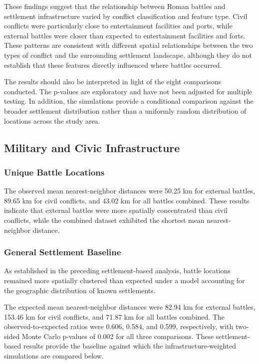 \documentclass[
  letterpaper,
  DIV=11,
  numbers=noendperiod]{scrartcl}
\begin{document}
These findings suggest that the relationship between Roman battles and
settlement infrastructure varied by conflict classification and feature
type. Civil conflicts were particularly close to entertainment
facilities and ports, while external battles were closer than expected
to entertainment facilities and forts. These patterns are consistent
with different spatial relationships between the two types of conflict
and the surrounding settlement landscape, although they do not establish
that these features directly influenced where battles occurred.

The results should also be interpreted in light of the eight comparisons
conducted. The p-values are exploratory and have not been adjusted for
multiple testing. In addition, the simulations provide a conditional
comparison against the broader settlement distribution rather than a
uniformly random distribution of locations across the study area.

\subsection{Military and Civic
Infrastructure}\label{military-and-civic-infrastructure-1}

\subsubsection{Unique Battle Locations}\label{unique-battle-locations}

The observed mean nearest-neighbor distances were 50.25 km for external
battles, 89.65 km for civil conflicts, and 43.02 km for all battles
combined. These results indicate that external battles were more
spatially concentrated than civil conflicts, while the combined dataset
exhibited the shortest mean nearest-neighbor distance.

\subsubsection{General Settlement
Baseline}\label{general-settlement-baseline}

As established in the preceding settlement-based analysis, battle
locations remained more spatially clustered than expected under a model
accounting for the geographic distribution of known settlements.

The expected mean nearest-neighbor distances were 82.94 km for external
battles, 153.46 km for civil conflicts, and 71.87 km for all battles
combined. The observed-to-expected ratios were 0.606, 0.584, and 0.599,
respectively, with two-sided Monte Carlo p-values of 0.002 for all three
comparisons. These settlement-based results provide the baseline against
which the infrastructure-weighted simulations are compared below.
\end{document}
